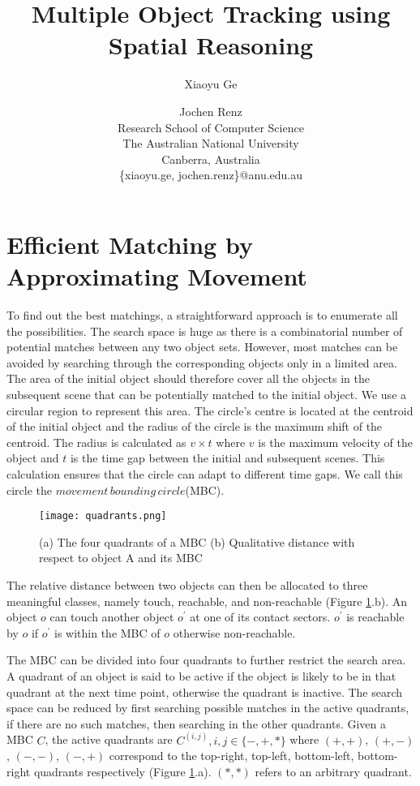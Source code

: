\documentclass[letterpaper]{article}
\title{Multiple Object Tracking using Spatial Reasoning}
\author{Xiaoyu Ge \and Jochen Renz \\
Research School of Computer Science\\
The Australian National University \\
Canberra, Australia\\
\{xiaoyu.ge, jochen.renz\}@anu.edu.au
}
\begin{document}
\section{Efficient Matching by Approximating Movement}\label{approxM}

To find out the best matchings, a straightforward approach is to enumerate all the possibilities. The search space is huge as there is a combinatorial number of potential matches between any two object sets. However, most matches can be avoided by searching through the corresponding objects only in a limited area. The area of the initial object should therefore cover all the objects in the subsequent scene that can be potentially matched to the initial object.  We use a circular region to represent this area. The circle's centre is located at the centroid of the initial object and the radius of the circle is the maximum shift of the centroid. The radius is calculated as $v \times t$ where $v$ is the maximum velocity of the object and $t$ is the time gap between the initial and subsequent scenes. This calculation ensures that the circle can adapt to different time gaps. We call this circle the $movement\,bounding\,circle$(MBC).  
\begin{figure}[h!]
\centering\texttt{[image: quadrants.png]}\caption{(a) The four quadrants of a MBC (b) Qualitative distance with respect to object A and its MBC}
\label{Quadrants}
\end{figure}

The relative distance between two objects can then be allocated to three meaningful classes, namely touch, reachable, and non-reachable (Figure \ref{Quadrants}.b). An object $o$ can touch another object $o^\prime$ at one of its contact sectors. $o^\prime$ is reachable by $o$ if $o^\prime$ is within the MBC of $o$ otherwise non-reachable. 

The MBC can be divided into four quadrants to further restrict the search area. A quadrant of an object is said to be active if the object is likely to be in that quadrant at the next time point, otherwise the quadrant is inactive. The search space can be reduced by first searching possible matches in the active quadrants, if there are no such matches, then searching in the other quadrants. Given a MBC $C$, the active quadrants are $C^{(i,j)}, i,j \in \{-, +, *\}$ where $(+,+)$, $(+,-)$, $(-,-)$, $(-,+)$ correspond to the top-right, top-left, bottom-left, bottom-right quadrants respectively (Figure \ref{Quadrants}.a). $(*, *)$ refers to an arbitrary quadrant. 
\end{document}
